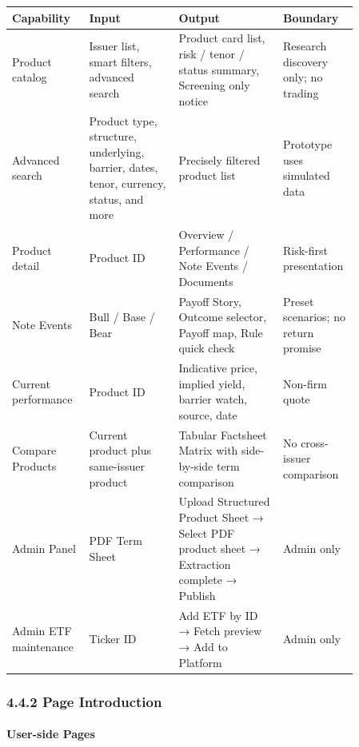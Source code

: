 \begingroup
\small
\begin{longtable}{L{0.18\linewidth}L{0.24\linewidth}L{0.28\linewidth}L{0.16\linewidth}}
\toprule
\textbf{Capability} & \textbf{Input} & \textbf{Output} & \textbf{Boundary} \\
\midrule
Product catalog & Issuer list, smart filters, advanced search & Product card list, risk / tenor / status summary, Screening only notice & Research discovery only; no trading \\
Advanced search & Product type, structure, underlying, barrier, dates, tenor, currency, status, and more & Precisely filtered product list & Prototype uses simulated data \\
Product detail & Product ID & Overview / Performance / Note Events / Documents & Risk-first presentation \\
Note Events & Bull / Base / Bear & Payoff Story, Outcome selector, Payoff map, Rule quick check & Preset scenarios; no return promise \\
Current performance & Product ID & Indicative price, implied yield, barrier watch, source, date & Non-firm quote \\
Compare Products & Current product plus same-issuer product & Tabular Factsheet Matrix with side-by-side term comparison & No cross-issuer comparison \\
Admin Panel & PDF Term Sheet & Upload Structured Product Sheet → Select PDF product sheet → Extraction complete → Publish & Admin only \\
Admin ETF maintenance & Ticker ID & Add ETF by ID → Fetch preview → Add to Platform & Admin only \\
\bottomrule
\end{longtable}
\endgroup

\subsubsection{4.4.2 Page Introduction}

\paragraph{User-side Pages}






